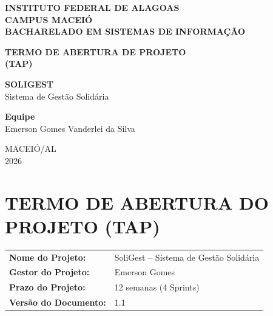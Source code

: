 \documentclass[12pt,a4paper]{article}
\begin{document}

\begin{titlepage}
\begin{center}

{\large\textbf{INSTITUTO FEDERAL DE ALAGOAS}}\\
{\large\textbf{CAMPUS MACEIÓ}}\\
{\large\textbf{BACHARELADO EM SISTEMAS DE INFORMAÇÃO}}

\vfill

{\Large\textbf{TERMO DE ABERTURA DE PROJETO}}\\[0.3cm]
{\Large\textbf{(TAP)}}

\vfill

{\large\textbf{SOLIGEST}}\\
{\large Sistema de Gestão Solidária}

\vfill

\textbf{Equipe}\\[0.2cm]
Emerson Gomes Vanderlei da Silva

\vfill

MACEIÓ/AL\\
2026

\end{center}
\end{titlepage}


\section*{TERMO DE ABERTURA DO PROJETO (TAP)}

\begin{tabularx}{\textwidth}{P{4.2cm}Y}
\textbf{Nome do Projeto:} &
SoliGest -- Sistema de Gestão Solidária \\

\textbf{Gestor do Projeto:} &
Emerson Gomes \\

\textbf{Prazo do Projeto:} &
12 semanas (4 Sprints) \\

\textbf{Versão do Documento:} &
1.1 \\
\end{tabularx}

\vspace{0.5cm}
\end{document}
